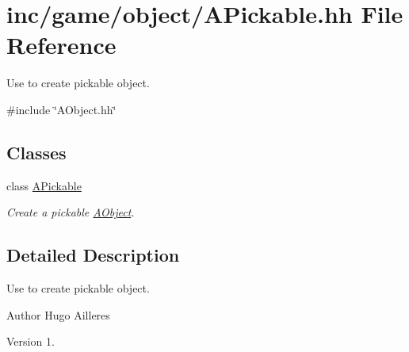 \hypertarget{APickable_8hh}{}\section{inc/game/object/\+A\+Pickable.hh File Reference}
\label{APickable_8hh}


Use to create pickable object.  


{\ttfamily \#include \char`\"{}A\+Object.\+hh\char`\"{}}\newline
\subsection*{Classes}
\begin{DoxyCompactItemize}
\item 
class \hyperlink{classAPickable}{A\+Pickable}
\begin{DoxyCompactList}\small\item\em Create a pickable \hyperlink{classAObject}{A\+Object}. \end{DoxyCompactList}\end{DoxyCompactItemize}


\subsection{Detailed Description}
Use to create pickable object. 

\begin{DoxyAuthor}{Author}
Hugo Ailleres 
\end{DoxyAuthor}
\begin{DoxyVersion}{Version}
1. 
\end{DoxyVersion}
